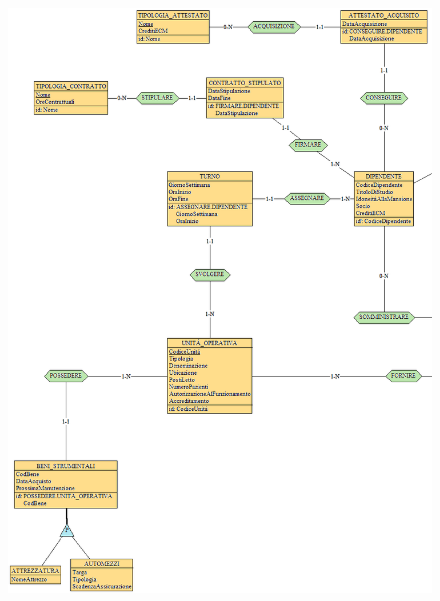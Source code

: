 \documentclass[a4paper, 12pt]{report}
\begin{document}
\begin{figure}[H]
        \centering
        \includegraphics[width=1.0\textwidth]{img/ERFinaleSX.png}
\end{figure}
\end{document}

